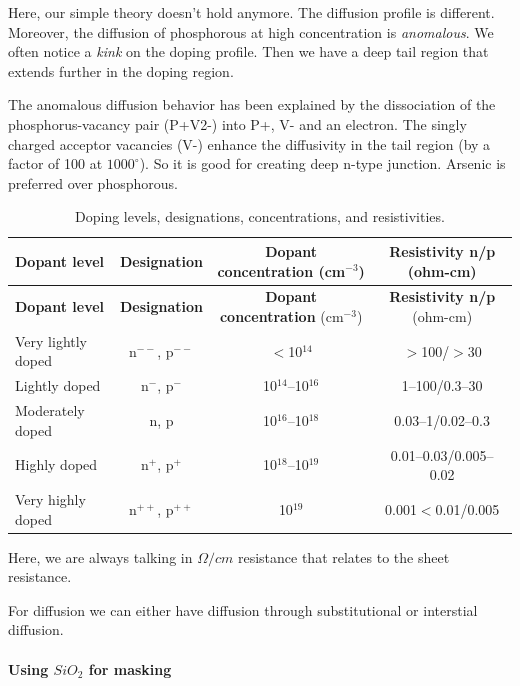 \documentclass[
]{article}
\begin{document}
Here, our simple theory doesn't hold anymore. The diffusion profile is
different. Moreover, the diffusion of phosphorous at high concentration
is \emph{anomalous}. We often notice a \emph{kink} on the doping
profile. Then we have a deep tail region that extends further in the
doping region.

The anomalous diffusion behavior has been explained by the dissociation
of the phosphorus-vacancy pair (P+V2-) into P+, V- and an electron. The
singly charged acceptor vacancies (V-) enhance the diffusivity in the
tail region (by a factor of 100 at \(1000^\circ\)). So it is good for
creating deep n-type junction. Arsenic is preferred over phosphorous.

\hypertarget{tab:doping_levels}{}
\begin{longtable}[]{@{}lccc@{}}
\caption{Doping levels, designations, concentrations, and
resistivities.}\tabularnewline
\toprule\noalign{}
\textbf{Dopant level} & \textbf{Designation} & \textbf{Dopant
concentration} (cm\(^{-3}\)) & \textbf{Resistivity n/p} (ohm-cm) \\
\midrule\noalign{}
\endfirsthead
\toprule\noalign{}
\textbf{Dopant level} & \textbf{Designation} & \textbf{Dopant
concentration} (cm\(^{-3}\)) & \textbf{Resistivity n/p} (ohm-cm) \\
\midrule\noalign{}
\endhead
\bottomrule\noalign{}
\endlastfoot
Very lightly doped & n\(^{--}\), p\(^{--}\) & \(<\)10\(^{14}\) &
\(>\)100/\(>\)30 \\
Lightly doped & n\(^{-}\), p\(^{-}\) & 10\(^{14}\)--10\(^{16}\) &
1--100/0.3--30 \\
Moderately doped & n, p & 10\(^{16}\)--10\(^{18}\) &
0.03--1/0.02--0.3 \\
Highly doped & n\(^{+}\), p\(^{+}\) & 10\(^{18}\)--10\(^{19}\) &
0.01--0.03/0.005--0.02 \\
Very highly doped & n\(^{++}\), p\(^{++}\) & 10\(^{19}\) &
0.001\(<\)0.01/0.005 \\
\end{longtable}

Here, we are always talking in \(\Omega / cm\) resistance that relates
to the sheet resistance.

For diffusion we can either have diffusion through substitutional or
interstial diffusion.

\hypertarget{using-sio_2-for-masking}{%
\paragraph{\texorpdfstring{Using \(SiO_2\) for
masking}{Using SiO\_2 for masking}}\label{using-sio_2-for-masking}}
\end{document}
